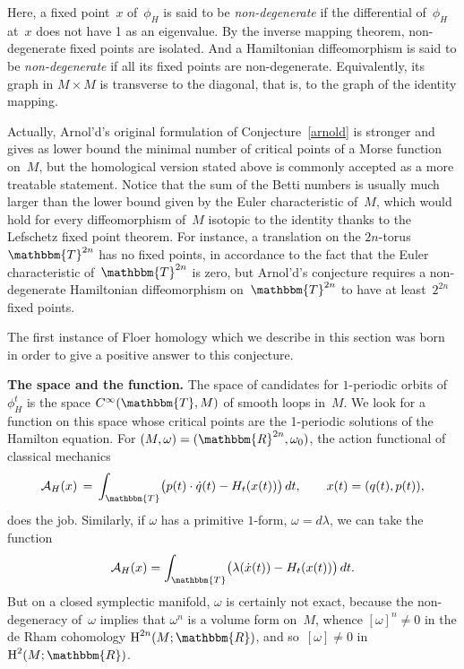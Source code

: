 \documentclass[12pt,twoside]{amsart}
\theoremstyle{plain}
\numberwithin{figure}{section}
\numberwithin{equation}{section}
\def\m{\medskip}
\def\H{\operatorname{H}}
\def\go{\omega}
\def\ca{{\mathcal A}}
\def\RR{\mathbbm{R}}
\def\TT{\mathbbm{T}}
\def\ni{\noindent}
\def\m{\medskip}
\begin{document}
Here, a fixed point~$x$ of~$\phi_H$ is said to be {\it non-degenerate}\/ 
if the differential of~$\phi_H$ at~$x$ does not have 1 as an eigenvalue. 
By the inverse mapping theorem, non-degenerate fixed points are isolated. 
And a Hamiltonian diffeomorphism is said to be {\it non-degenerate}\/ 
if all its fixed points are non-degenerate.
Equivalently, its graph in $M \times M$ is transverse to the diagonal, 
that is, to the graph of the identity mapping.

Actually, Arnol'd's original formulation of Conjecture~\ref{arnold} is stronger and gives as lower bound the minimal number of critical points of a Morse function on~$M$, but the homological version stated above is commonly accepted as a more treatable statement. 
Notice that the sum of the Betti numbers is usually much larger than the lower bound given by the Euler characteristic of~$M$, which would hold for every diffeomorphism of~$M$ isotopic to the identity 
thanks to the Lefschetz fixed point theorem. For instance, a translation on the $2n$-torus $\TT^{2n}$ has no fixed points, in accordance to the fact that the Euler characteristic of~$\TT^{2n}$ is zero, but Arnol'd's conjecture requires a non-degenerate Hamiltonian diffeomorphism on~$\TT^{2n}$ to have at least~$2^{2n}$ fixed points.

The first instance of Floer homology which we describe in this section was born in order to give a positive answer to this conjecture.

\m \ni
{\bf The space and the function.}
The space of candidates for $1$-periodic orbits of~$\phi_H^t$ is the space $C^\infty(\TT,M)$
of smooth loops in~$M$. 
We look for a function on this space whose critical points are the 1-periodic solutions 
of the Hamilton equation. For $(M,\omega) = (\RR^{2n},\omega_0)$, the action functional 
of classical mechanics 
\[
\ca_H (x) \,=\, \int_{\TT} \bigl(p(t)\cdot \dot q(t) - H_t(x(t)) \bigr) \,dt, \qquad x(t) = (q(t), p(t)),
\]
does the job.
Similarly, if $\go$ has a primitive $1$-form, $\omega = d \lambda$, we can take the function
\begin{equation}
\label{withprimitive}
\ca_H (x) = \int_{\TT} \bigl( \lambda(\dot x(t)) - H_t (x(t)) \bigr) \,dt.
\end{equation}
But on a closed symplectic manifold, $\go$ is certainly not exact,
because the non-degeneracy of~$\go$ implies that $\go^n$ is a volume form on~$M$, 
whence $[\go]^n \neq 0$ in the de Rham cohomology $\H^{2n}(M;\RR)$, and so~$[\go] \neq 0$ in~$\H^2(M;\RR)$.
\end{document}
